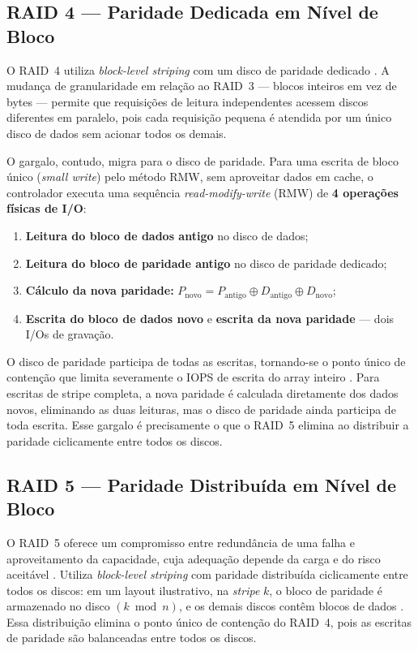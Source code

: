 \documentclass[titlepage]{article}
\begin{document}
\subsection{RAID 4 --- Paridade Dedicada em Nível de Bloco}
O RAID~4 utiliza \textit{block-level striping} com um disco de paridade dedicado \cite{silberschatz2020}. A mudança de granularidade em relação ao RAID~3 --- blocos inteiros em vez de bytes --- permite que requisições de leitura independentes acessem discos diferentes em paralelo, pois cada requisição pequena é atendida por um único disco de dados sem acionar todos os demais.

O gargalo, contudo, migra para o disco de paridade. Para uma escrita de bloco único (\textit{small write}) pelo método RMW, sem aproveitar dados em cache, o controlador executa uma sequência \textit{read-modify-write} (RMW) de \textbf{4 operações físicas de I/O}:
\begin{enumerate}
    \item \textbf{Leitura do bloco de dados antigo} no disco de dados;
    \item \textbf{Leitura do bloco de paridade antigo} no disco de paridade dedicado;
    \item \textbf{Cálculo da nova paridade:} $P_{\mathrm{novo}} = P_{\mathrm{antigo}} \oplus D_{\mathrm{antigo}} \oplus D_{\mathrm{novo}}$;
    \item \textbf{Escrita do bloco de dados novo} e \textbf{escrita da nova paridade} --- dois I/Os de gravação.
\end{enumerate}
O disco de paridade participa de todas as escritas, tornando-se o ponto único de contenção que limita severamente o IOPS de escrita do array inteiro \cite{silberschatz2020}. Para escritas de stripe completa, a nova paridade é calculada diretamente dos dados novos, eliminando as duas leituras, mas o disco de paridade ainda participa de toda escrita. Esse gargalo é precisamente o que o RAID~5 elimina ao distribuir a paridade ciclicamente entre todos os discos.

\subsection{RAID 5 --- Paridade Distribuída em Nível de Bloco}
O RAID~5 oferece um compromisso entre redundância de uma falha e aproveitamento da capacidade, cuja adequação depende da carga e do risco aceitável \cite{silberschatz2020}. Utiliza \textit{block-level striping} com paridade distribuída ciclicamente entre todos os discos: em um layout ilustrativo, na \textit{stripe} $k$, o bloco de paridade é armazenado no disco $(k \bmod n)$, e os demais discos contêm blocos de dados \cite{silberschatz2020}. Essa distribuição elimina o ponto único de contenção do RAID~4, pois as escritas de paridade são balanceadas entre todos os discos.
\end{document}

